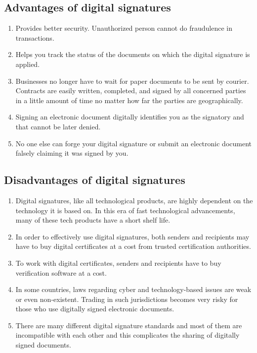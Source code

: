 \documentclass[12pt, a4paper]{article}
\begin{document}
\subsection{Advantages of digital signatures}
\begin{enumerate}
  \item Provides better security. Unauthorized person cannot do fraudulence in
    transactions.
  \item Helps you track the status of the documents on which the digital
    signature is applied.
  \item Businesses no longer have to wait for paper documents to be sent by
    courier. Contracts are easily written, completed, and signed by all
    concerned parties in a little amount of time no matter how far the parties
    are geographically.
  \item Signing an electronic document digitally identifies you as the
    signatory and that cannot be later denied.
  \item No one else can forge your digital signature or submit an electronic
    document falsely claiming it was signed by you.
\end{enumerate}

\subsection{Disadvantages of digital signatures}
\begin{enumerate}
  \item Digital signatures, like all technological products, are highly
    dependent on the technology it is based on. In this era of fast
    technological advancements, many of these tech products have a short shelf
    life.
  \item In order to effectively use digital signatures, both senders and
    recipients may have to buy digital certificates at a cost from trusted
    certification authorities.
  \item To work with digital certificates, senders and recipients have to buy 
    verification software at a cost.
  \item In some countries, laws regarding cyber and technology-based issues
    are weak or even non-existent. Trading in such jurisdictions becomes very
    risky for those who use digitally signed electronic documents.
  \item There are many different digital signature standards and most of them
    are incompatible with each other and this complicates the sharing of
    digitally signed documents.
\end{enumerate}%
\end{document}
